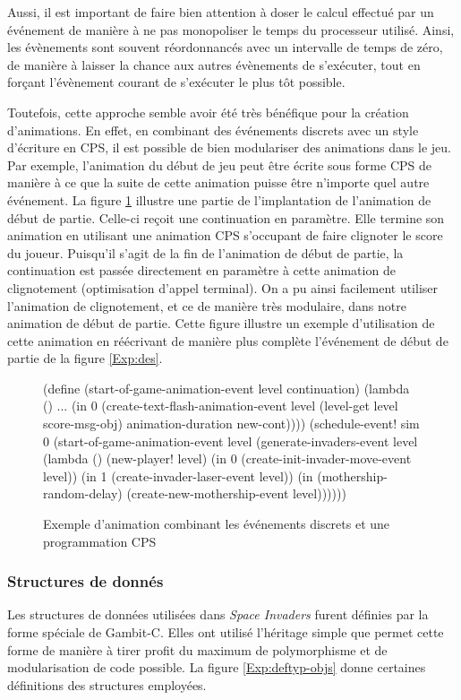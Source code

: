 \documentclass[12pt,twoside,letterpaper,francais]{book}
\newcommand{\si}{{\textit{Space Invaders }}}
\newcommand{\scheme}[1]{\selectlanguage{english}{\tt #1}\selectlanguage{french}}
\begin{document}
Aussi, il est important de faire bien attention à doser le calcul
effectué par un événement de manière à ne pas monopoliser le temps du
processeur utilisé. Ainsi, les évènements sont souvent réordonnancés
avec un intervalle de temps de zéro, de manière à laisser la chance
aux autres évènements de s'exécuter, tout en forçant l'évènement
courant de s'exécuter le plus tôt possible.

Toutefois, cette approche semble avoir été très bénéfique pour la
création d'animations. En effet, en combinant des événements discrets
avec un style d'écriture en CPS, il est possible de bien modulariser
des animations dans le jeu. Par exemple, l'animation du début de jeu
peut être écrite sous forme CPS de manière à ce que la suite de cette
animation puisse être n'importe quel autre événement. La figure
\ref{Exp:anim} illustre une partie de l'implantation de l'animation de
début de partie. Celle-ci reçoit une continuation en paramètre. Elle
termine son animation en utilisant une animation CPS s'occupant de
faire clignoter le score du joueur. Puisqu'il s'agit de la fin de
l'animation de début de partie, la continuation est passée directement
en paramètre à cette animation de clignotement (optimisation d'appel
terminal). On a pu ainsi facilement utiliser l'animation de
clignotement, et ce de manière très modulaire, dans notre animation de
début de partie. Cette figure illustre un exemple d'utilisation de
cette animation en réécrivant de manière plus complète l'événement de
début de partie de la figure \ref{Exp:des}.

\begin{figure}[htb!]
  \begin{schemecode}
(define (start-of-game-animation-event level continuation)
  (lambda ()
    ...
    (in 0 (create-text-flash-animation-event level
            (level-get level score-msg-obj)
            animation-duration new-cont))))
(schedule-event! sim 0
  (start-of-game-animation-event level
    (generate-invaders-event level
      (lambda ()
        (new-player! level)
        (in 0 (create-init-invader-move-event level))
        (in 1 (create-invader-laser-event level))
        (in (mothership-random-delay)
            (create-new-mothership-event level))))))
  \end{schemecode}
  \caption{Exemple d'animation combinant les événements discrets et
    une programmation CPS}
  \label{Exp:anim}
\end{figure}


\FloatBarrier
\subsubsection{Structures de donnés}
Les structures de données utilisées dans \si furent définies par la
forme spéciale \scheme{define-type} de Gambit-C. Elles ont utilisé
l'héritage simple que permet cette forme de manière à tirer profit du
maximum de polymorphisme et de modularisation de code possible. La
figure \ref{Exp:deftyp-objs} donne certaines définitions des
structures employées.
\end{document}
